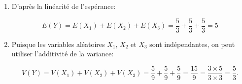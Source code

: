 \begin{enumerate}
\begin{enumerate}
		\item D'après la linéarité de l'espérance:
		
		\[E(Y) = E\left(X_{1}\right) + E\left(X_{2}\right) + E\left(X_{3}\right) = \dfrac{5}{3} + \dfrac{5}{3} + \dfrac{5}{3} = \boxed{5}\]
		
		\item Puisque les variables aléatoires $X_{1}$, $X_{2}$ et $X_{3}$ sont indépendantes, on peut utiliser l'additivité de la variance:
		
		\[V(Y) = V\left(X_{1}\right) + V\left(X_{2}\right) + V\left(X_{3}\right) = \dfrac{5}{9} + \dfrac{5}{9} + \dfrac{5}{9} = \dfrac{15}{9} = \dfrac{3 \times 5}{3 \times 3} = \boxed{\dfrac{5}{3}}.\]
	\end{enumerate}
\end{enumerate}


\bigskip
